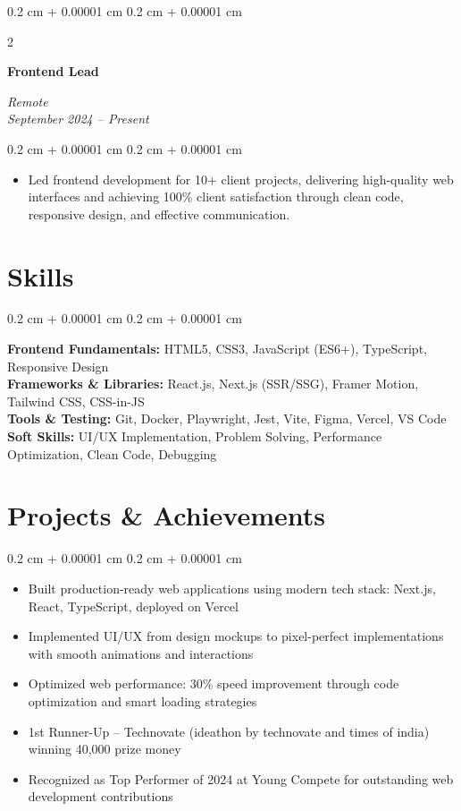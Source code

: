 \documentclass[10pt, letterpaper]{article}
\newenvironment{highlights}{
    \begin{itemize}[
        topsep=0.10 cm,
        parsep=0.10 cm,
        partopsep=0pt,
        itemsep=0pt,
        leftmargin=0.4 cm + 10pt
    ]
}{
    \end{itemize}
} %
\newenvironment{onecolentry}{
    \begin{adjustwidth}{
        0.2 cm + 0.00001 cm
    }{
        0.2 cm + 0.00001 cm
    }
}{
    \end{adjustwidth}
} %
\newenvironment{twocolentry}[2][]{
    \onecolentry
    \def\secondColumn{#2}
    \setcolumnwidth{\fill, 4.5 cm}
    \begin{paracol}{2}
}{
    \switchcolumn \raggedleft \secondColumn
    \end{paracol}
    \endonecolentry
} %
\let\hrefWithoutArrow\href
\renewcommand{\href}[2]{\hrefWithoutArrow{#1}{\ifthenelse{\equal{#2}{}}{ }{#2 }\raisebox{.15ex}{\footnotesize \faExternalLink*}}}
\begin{document}
    \vspace{0.2 cm}
    \begin{twocolentry}{
        \textit{Remote} \\
        \textit{September 2024 – Present}
    }
        \textbf{Frontend Lead} \\
        \textit{\href{https://www.sugcreative.com/}{SUG Creative}}
    \end{twocolentry}
    \vspace{0.10 cm}
    \begin{onecolentry}
        \begin{highlights}
            \item Led frontend development for 10+ client projects, delivering high-quality web interfaces and achieving 100\% client satisfaction through clean code, responsive design, and effective communication.
        \end{highlights}
    \end{onecolentry}

    \section{Skills}
    \begin{onecolentry}
        \textbf{Frontend Fundamentals:} HTML5, CSS3, JavaScript (ES6+), TypeScript, Responsive Design \\
        \textbf{Frameworks \& Libraries:} React.js, Next.js (SSR/SSG), Framer Motion, Tailwind CSS, CSS-in-JS \\
        \textbf{Tools \& Testing:} Git, Docker, Playwright, Jest, Vite, Figma, Vercel, VS Code \\
        \textbf{Soft Skills:} UI/UX Implementation, Problem Solving, Performance Optimization, Clean Code, Debugging
    \end{onecolentry}

    \section{Projects \& Achievements}
    \begin{onecolentry}
        \begin{highlights}
            \item Built production-ready web applications using modern tech stack: Next.js, React, TypeScript, deployed on Vercel
            \item Implemented UI/UX from design mockups to pixel-perfect implementations with smooth animations and interactions
            \item Optimized web performance: 30\% speed improvement through code optimization and smart loading strategies
            \item 1st Runner-Up – Technovate (ideathon by technovate and times of india) winning 40,000 prize money
            \item Recognized as Top Performer of 2024 at Young Compete for outstanding web development contributions
        \end{highlights}
    \end{onecolentry}
\end{document}
